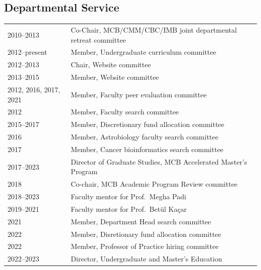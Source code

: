 \documentclass[11pt]{article}
\begin{document}
\subsection*{Departmental Service}
\begin{longtable}[l]{l l}
2010--2013 & Co-Chair, MCB/CMM/CBC/IMB joint departmental retreat committee\\
2012--present & Member, Undergraduate curriculum committee\\
2012--2013 & Chair, Website committee\\
2013--2015 & Member, Website committee\\
2012, 2016, 2017, 2021 & Member, Faculty peer evaluation committee\\
2012 & Member, Faculty search committee\\
2015--2017 & Member, Discretionary fund allocation committee\\
2016 & Member, Astrobiology faculty search committee\\
2017 & Member, Cancer bioinformatics search committee\\
2017--2023 & Director of Graduate Studies, MCB Accelerated Master's Program\\
2018 & Co-chair, MCB Academic Program Review committee\\
2018--2023& Faculty mentor for Prof.\ Megha Padi\\
2019--2021 & Faculty mentor for Prof.\ Bet{\"u}l Ka{\c c}ar\\
2021 & Member, Department Head search committee\\
2022 & Member, Disretionary fund allocation committee\\
2022 & Member, Professor of Practice hiring committee\\
2022--2023 & Director, Undergraduate and Master's Education
\end{longtable}
\end{document}
